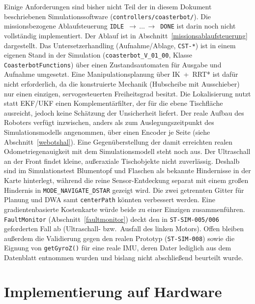 \documentclass[
  a4paper,
  12pt,
  DIV=12,        %
  parskip=half,  %
  headings=small %
]{scrartcl}
\theoremstyle{definition}
\theoremstyle{definition}
\begin{document}
Einige Anforderungen sind bisher nicht Teil der in diesem Dokument
beschriebenen Simulationssoftware (\texttt{controllers/coasterbot/}). Die
missionsbezogene Ablaufsteuerung
\texttt{IDLE\,$\to\,\ldots\,\to$\,DONE} ist darin noch nicht vollständig
implementiert. Der Ablauf ist in Abschnitt~\ref{missionsablaufsteuerung}
dargestellt. Das Untersetzerhandling (Aufnahme/Ablage,
\texttt{CST-*}) ist in einem eigenen Stand in der Simulation
(\texttt{coasterbot\_V\_01\_00}, Klasse \texttt{CoasterbotFunctions}) über
einen Zustandsautomaten für Ausgabe und Aufnahme umgesetzt. Eine
Manipulationsplanung über IK~+~RRT* ist dafür nicht erforderlich, da die
konstruierte Mechanik (Hubscheibe mit Ausschieber) nur einen
einzigen, servogesteuerten Freiheitsgrad besitzt. Die Lokalisierung nutzt
statt EKF/UKF einen Komplementärfilter, der für die ebene Tischfläche
ausreicht, jedoch keine Schätzung der Unsicherheit liefert. Der reale Aufbau des
Roboters verfügt inzwischen, anders als zum Auslegungszeitpunkt des
Simulationsmodells angenommen, über einen Encoder je Seite (siehe
Abschnitt~\ref{webotshal}). Eine Gegenüberstellung der damit erreichten
realen Odometriegenauigkeit mit dem Simulationsmodell steht noch aus. Der
Ultraschall an der Front findet kleine, außeraxiale Tischobjekte nicht
zuverlässig. Deshalb sind im
Simulationstest Blumentopf und Flaschen als bekannte Hindernisse in der
Karte hinterlegt, während die reine Sensor-Entdeckung separat mit einem
großen Hindernis in \texttt{MODE\_NAVIGATE\_DSTAR} gezeigt wird. Die zwei
getrennten Gitter für Planung und DWA samt \texttt{centerPath} könnten
verbessert werden. Eine gradientenbasierte Kostenkarte würde beide
zu einer Einzigen zusammenführen. \texttt{FaultMonitor}
(Abschnitt~\ref{faultmonitor}) deckt den in \texttt{ST-SIM-005/006}
geforderten Fall ab (Ultraschall- bzw.\ Ausfall des linken Motors).
Offen bleiben außerdem die Validierung gegen den realen
Prototyp (\texttt{ST-SIM-008}) sowie die Eignung von \texttt{getGyroZ()}
für eine reale IMU, deren Dater lediglich aus dem Datenblatt entnommen wurden
und  bislang nicht abschließend beurteilt wurde.



\section{Implementierung auf Hardware}\label{hardwareimplementierung}
\end{document}
